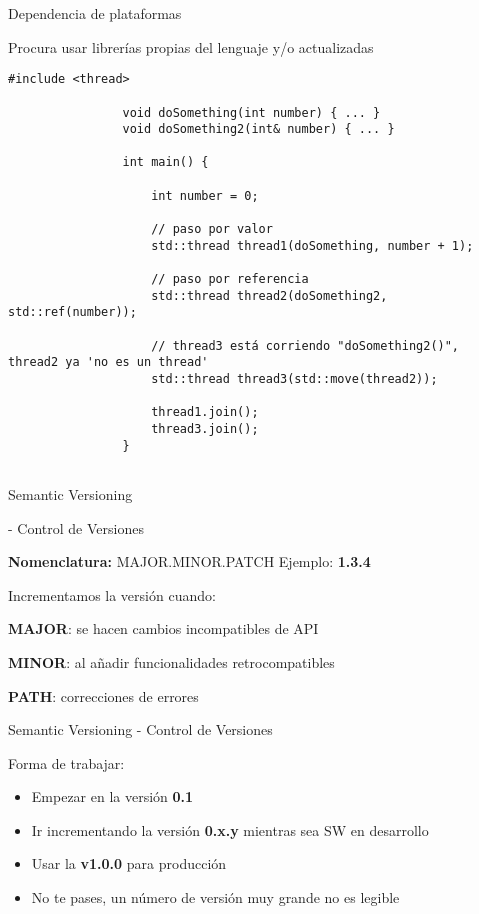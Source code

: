 \documentclass{beamer}
\newcommand{\normalSizeItem}[1] {
  \normalsize{\item #1}
}
\newcommand{\smallCite}[1]{
	\begin{small}
		\cite{#1}	
	\end{small}
}
\begin{document}
		\begin{frame}[fragile]{Dependencia de plataformas}	
			\begin{itemize}

				\normalSizeItem { Procura usar librerías propias del lenguaje y/o actualizadas }
				\begin{lstlisting}[basicstyle={\tiny\ttfamily}]
				#include <thread>
				
				void doSomething(int number) { ... }
				void doSomething2(int& number) { ... }
				
				int main() {
				
					int number = 0;
					
					// paso por valor
					std::thread thread1(doSomething, number + 1); 
					
					// paso por referencia
					std::thread thread2(doSomething2, std::ref(number)); 
					
					// thread3 está corriendo "doSomething2()", thread2 ya 'no es un thread'
					std::thread thread3(std::move(thread2)); 
					
					thread1.join();
					thread3.join();					
				}
				
				\end{lstlisting}
				
			\end{itemize}
		\end{frame}
		
		\begin{frame}[fragile]{Semantic Versioning \smallCite{semanticVersioning} - Control de Versiones}	
			
			\textbf{Nomenclatura:} MAJOR.MINOR.PATCH
			\newline\newline
			Ejemplo: \textbf{1.3.4}
		
			Incrementamos la versión cuando:
			\begin{itemize}

				\normalSizeItem { \textbf{MAJOR}: se hacen cambios incompatibles de API}
				\normalSizeItem { \textbf{MINOR}: al añadir funcionalidades retrocompatibles }
				\normalSizeItem { \textbf{PATH}: correcciones de errores }
			\end{itemize}
		\end{frame}
		
		\begin{frame}[fragile]{Semantic Versioning - Control de Versiones}	
			
			Forma de trabajar:
			\begin{itemize}
				\item Empezar en la versión \textbf{0.1}
				\item Ir incrementando la versión \textbf{0.x.y }mientras sea SW en desarrollo
				\item Usar la \textbf{v1.0.0} para producción
				\item No te pases, un número de versión muy grande no es legible
			\end{itemize}
		\end{frame}
		
\end{document}
